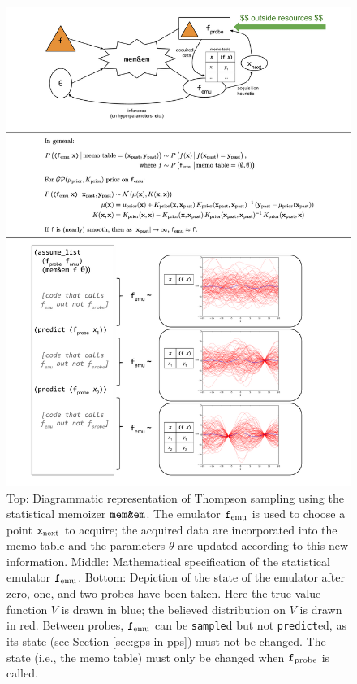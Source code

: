 \begin{figure}[p]
  \centering
  \includegraphics[height=0.8\textheight]{figs/slide1.pdf}
  \caption{
    Top: Diagrammatic representation of Thompson sampling using the statistical
    memoizer $\texttt{mem\&em}$.  The emulator $\texttt{f}_{\textrm{emu}}$ is used to choose a point
    $\texttt{x}_{\textrm{next}}$ to acquire; the acquired data are incorporated into the memo
    table and the parameters $\theta$ are updated according to this new
    information.
    Middle: Mathematical specification of the statistical emulator $\texttt{f}_{\textrm{emu}}$.
    Bottom: Depiction of the state of the emulator after zero, one, and two
    probes have been taken.  Here the true value function $V$ is drawn in blue;
    the believed distribution on $V$ is drawn in red.  Between probes,
    $\texttt{f}_{\textrm{emu}}$ can be \texttt{sample}d but not \texttt{predict}ed, as its state
    (see Section \ref{sec:gps-in-pps}) must not be changed.  The state (i.e.,
    the memo table) must only be changed when $\texttt{f}_{\textrm{probe}}$ is called.
  }
  \label{fig:slide1}
\end{figure}

